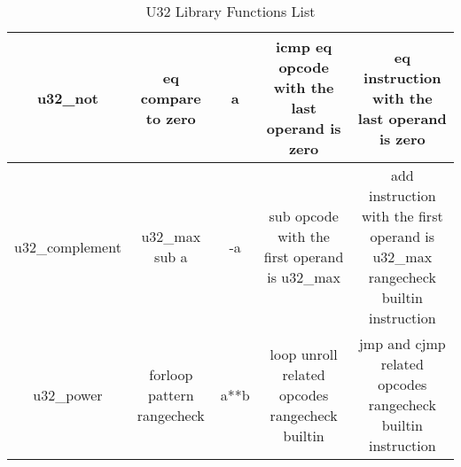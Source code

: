 \begin{table}[!htp]
{\begin{tabular}{|c|c|c|c|c|}
                u32\_not  & eq compare to zero & \!a & icmp eq opcode with the last operand is zero & eq instruction with the last operand is zero \\ \hline
                u32\_complement  & u32\_max sub a & -a & sub opcode with the first operand is u32\_max & \makecell{add instruction with the first operand is u32\_max \\ rangecheck builtin instruction}  \\ \hline
                u32\_power  & \makecell{forloop pattern \\ rangecheck} & a**b & \makecell{loop unroll related opcodes \\ rangecheck builtin} & \makecell{jmp and cjmp related opcodes \\ rangecheck builtin instruction} \\ \hline
            \end{tabular}}
        \caption{U32 Library Functions List}
        \label{table:u32-libFunctions-list}
    \end{table}
